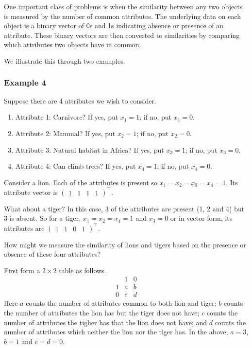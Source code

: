 \documentclass[
]{book}
\providecommand{\tightlist}{%
  \setlength{\itemsep}{0pt}\setlength{\parskip}{0pt}}
\theoremstyle{definition}
\theoremstyle{definition}
\theoremstyle{definition}
\theoremstyle{definition}
\theoremstyle{remark}
\begin{document}
One important class of problems is when the similarity between any two objects is measured by the number of common attributes. The underlying data on each object is a binary vector of 0s and 1s indicating absence or presence of an attribute. These binary vectors are then converted to similarities by comparing which attributes two objects have in common.

We illustrate this through two examples.

\subsubsection*{Example 4}\label{example-4}

Suppose there are 4 attributes we wish to consider.

\begin{enumerate}
\def\labelenumi{\arabic{enumi}.}
\tightlist
\item
  Attribute 1: Carnivore? If yes, put \(x_1=1\); if no, put \(x_1=0\).
\item
  Attribute 2: Mammal? If yes, put \(x_2=1\); if no, put \(x_2=0\).
\item
  Attribute 3: Natural habitat in Africa? If yes, put \(x_3=1\); if no, put \(x_3=0\).
\item
  Attribute 4: Can climb trees? If yes, put \(x_4=1\); if no, put \(x_4=0\).
\end{enumerate}

Consider a lion. Each of the attributes is present so \(x_1=x_2=x_3=x_4=1\). Its attribute vector is \(\begin{pmatrix} 1&1&1&1\end{pmatrix}^\top\).

What about a tiger? In this case, 3 of the attributes are present (1, 2 and 4) but 3 is absent.
So for a tiger, \(x_1=x_2=x_4=1\) and \(x_3=0\) or in vector form, its attributes are \(\begin{pmatrix} 1&1&0&1\end{pmatrix}^\top\).

How might we measure the similarity of lions and tigers based on the presence or absence of these four attributes?

First form a \(2 \times 2\) table as follows.
\[
\begin{array}{cccc}
&1 &0\\
1& a & b\\
0& c & d
\end{array}
\]
Here \(a\) counts the number of attributes common to both lion and tiger; \(b\) counts the number of attributes the lion has but the tiger does not have; \(c\) counts the number of attributes the tigher has that the lion does not have; and \(d\) counts the number of attributes which neither the lion nor the tiger has.
In the above, \(a=3\), \(b=1\) and \(c=d=0\).
\end{document}

